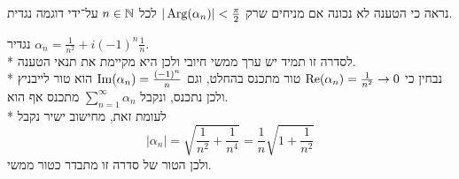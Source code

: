 \Subquestion{}
נראה כי הטענה לא נכונה אם מניחים שרק $|\operatorname{Arg}(\alpha_n)| < \frac{\pi}{2}$ לכל $n \in \mathbb{N}$ על־ידי דוגמה נגדית.
\begin{solution}
	נגדיר $\alpha_n = \frac{1}{n^2} + i {(-1)}^n \frac{1}{n}$. \\*
	לסדרה זו תמיד יש ערך ממשי חיובי ולכן היא מקיימת את תנאי הטענה. \\*
	נבחין כי $\operatorname{Re}(\alpha_n) = \frac{1}{n^2} \to 0$ טור מתכנס בהחלט, וגם $\operatorname{Im}(\alpha_n) = \frac{{(-1)}^n}{n}$ הוא טור לייבניץ ולכן נתכנס, ונקבל $\sum_{n = 1}^{\infty} \alpha_n$ מתכנס אף הוא. \\*
	לעומת זאת, מחישוב ישיר נקבל
	\[
		|\alpha_n| = \sqrt{\frac{1}{n^2} + \frac{1}{n^4}} = \frac{1}{n} \sqrt{1 + \frac{1}{n^2}}
	\]
	ולכן הטור של סדרה זו מתבדר כטור ממשי.
\end{solution}


